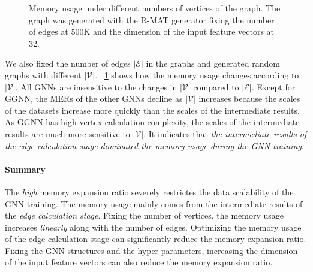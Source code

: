 \begin{figure}
    \centering
    \caption{Memory usage under different numbers of vertices of the graph. The graph was generated with the R-MAT generator fixing the number of edges at 500K and the dimension of the input feature vectors at 32.}
    \label{fig:exp_memory_expansion_ratio_input_graph_number_of_vertices_fixed_edge}
\end{figure}

We also fixed the number of edges $|\mathcal{E}|$ in the graphs and generated random graphs with different $|\mathcal{V}|$.
\figurename~\ref{fig:exp_memory_expansion_ratio_input_graph_number_of_vertices_fixed_edge} shows how the memory usage changes according to $|\mathcal{V}|$.
All GNNs are insensitive to the changes in $|\mathcal{V}|$ compared to $|\mathcal{E}|$.
Except for GGNN, the MERs of the other GNNs decline as $|\mathcal{V}|$ increases because the scales of the datasets increase more quickly than the scales of the intermediate results.
As GGNN has high vertex calculation complexity, the scales of the intermediate results are much more sensitive to $|\mathcal{V}|$.
It indicates that \emph{the intermediate results of the edge calculation stage dominated the memory usage during the GNN training}.

\paragraph{Summary}
The \emph{high} memory expansion ratio severely restrictes the data scalability of the GNN training.
The memory usage mainly comes from the intermediate results of the \emph{edge calculation stage}.
Fixing the number of vertices, the memory usage increases \emph{linearly} along with the number of edges.
Optimizing the memory usage of the edge calculation stage can significantly reduce the memory expansion ratio.
Fixing the GNN structures and the hyper-parameters, increasing the dimension of the input feature vectors can also reduce the memory expansion ratio.

